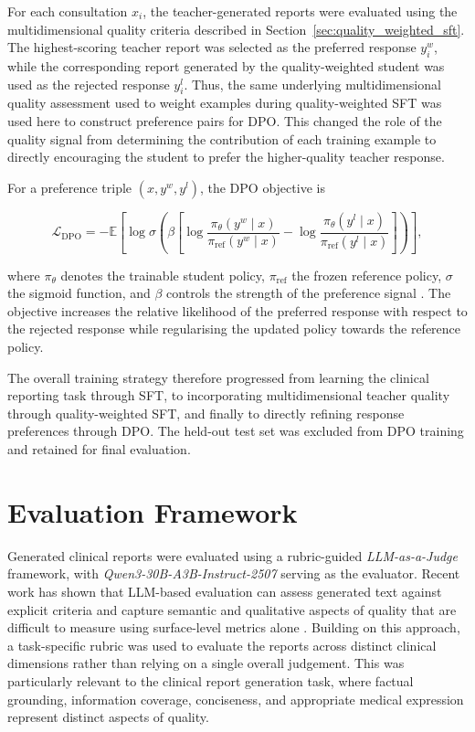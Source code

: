 \documentclass[ %
                    author={Aman Kumar Singh},
                supervisor={Dr. Edwin Simpson},
                    degree={MSc},
                     title={Quality-Aware Knowledge Distillation of Large Language Models for Efficient Personalised Clinical Report Generation},
                  subtitle={},
                      type={},
                      year={2021}]{dissertation}
\begin{document}
For each consultation $x_i$, the teacher-generated reports were evaluated
using the multidimensional quality criteria described in
Section~\ref{sec:quality_weighted_sft}. The highest-scoring teacher report
was selected as the preferred response $y_i^{w}$, while the corresponding
report generated by the quality-weighted student was used as the rejected
response $y_i^{l}$. Thus, the same underlying multidimensional quality
assessment used to weight examples during quality-weighted SFT was used
here to construct preference pairs for DPO. This changed the role of the
quality signal from determining the contribution of each training example
to directly encouraging the student to prefer the higher-quality teacher
response.

For a preference triple $(x,y^{w},y^{l})$, the DPO objective is

\begin{equation}
\mathcal{L}_{\mathrm{DPO}}
=
-\mathbb{E}
\left[
\log \sigma
\left(
\beta
\left[
\log
\frac{\pi_{\theta}(y^{w}\mid x)}
     {\pi_{\mathrm{ref}}(y^{w}\mid x)}
-
\log
\frac{\pi_{\theta}(y^{l}\mid x)}
     {\pi_{\mathrm{ref}}(y^{l}\mid x)}
\right]
\right)
\right],
\end{equation}

where $\pi_{\theta}$ denotes the trainable student policy,
$\pi_{\mathrm{ref}}$ the frozen reference policy, $\sigma$ the sigmoid
function, and $\beta$ controls the strength of the preference signal
\cite{rafailov_direct_2024}. The objective increases the relative
likelihood of the preferred response with respect to the rejected response
while regularising the updated policy towards the reference policy.

The overall training strategy therefore progressed from learning the
clinical reporting task through SFT, to incorporating multidimensional
teacher quality through quality-weighted SFT, and finally to directly
refining response preferences through DPO. The held-out test set was
excluded from DPO training and retained for final evaluation.
\section{Evaluation Framework}
\label{sec:evaluation_framework}
Generated clinical reports were evaluated using a rubric-guided
\textit{LLM-as-a-Judge} framework, with
\textit{Qwen3-30B-A3B-Instruct-2507} serving as the evaluator. Recent work
has shown that LLM-based evaluation can assess generated text against
explicit criteria and capture semantic and qualitative aspects of quality
that are difficult to measure using surface-level metrics alone
\cite{liu_g-eval_2023,moslemi_survey_2024}. Building on this approach, a
task-specific rubric was used to evaluate the reports across distinct
clinical dimensions rather than relying on a single overall judgement.
This was particularly relevant to the clinical report generation task,
where factual grounding, information coverage, conciseness, and appropriate
medical expression represent distinct aspects of quality.
\end{document}
